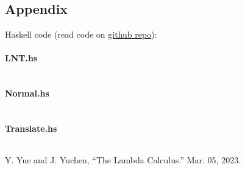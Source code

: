 \documentclass{article}
\theoremstyle{definition}
\begin{document}
\subsection*{Appendix}

Haskell code (read code on \href{https://github.com/linsyking/SPELL23-Notes/tree/master/h2/lnt}{github repo}):

\paragraph*{LNT.hs}
\inputminted{haskell}{lnt/src/LNT.hs}

\paragraph*{Normal.hs}
\inputminted{haskell}{lnt/src/Normal.hs}

\paragraph*{Translate.hs}
\inputminted{haskell}{lnt/src/Translate.hs}

\begin{thebibliography}{9}
     Y. Yue and J. Yuchen, “The Lambda Calculus.” Mar. 05, 2023.
\end{thebibliography}
\end{document}
